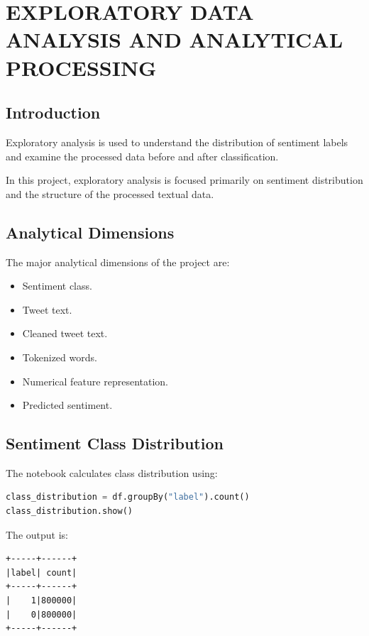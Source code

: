 \documentclass[12pt,a4paper]{article}
\begin{document}
\section{EXPLORATORY DATA ANALYSIS AND ANALYTICAL PROCESSING}

\subsection{Introduction}

Exploratory analysis is used to understand the distribution of sentiment labels and examine the processed data before and after classification.

In this project, exploratory analysis is focused primarily on sentiment distribution and the structure of the processed textual data.

\subsection{Analytical Dimensions}

The major analytical dimensions of the project are:

\begin{itemize}
    \item Sentiment class.
    \item Tweet text.
    \item Cleaned tweet text.
    \item Tokenized words.
    \item Numerical feature representation.
    \item Predicted sentiment.
\end{itemize}

\subsection{Sentiment Class Distribution}

The notebook calculates class distribution using:

\begin{lstlisting}[language=Python]
class_distribution = df.groupBy("label").count()
class_distribution.show()
\end{lstlisting}

The output is:

\begin{lstlisting}
+-----+------+
|label| count|
+-----+------+
|    1|800000|
|    0|800000|
+-----+------+
\end{lstlisting}
\end{document}
